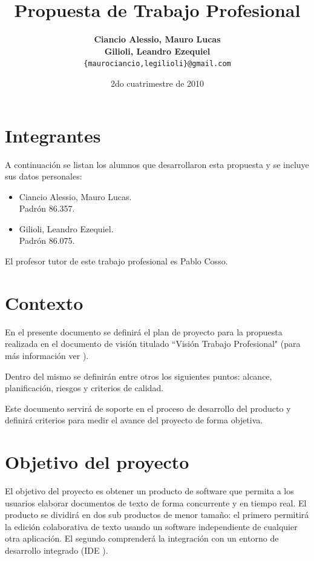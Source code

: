 \documentclass[12pt,a4paper]{article}
\title { \textbf{Propuesta de Trabajo Profesional}}
\date{2do cuatrimestre de 2010}
\author{\textbf{Ciancio Alessio, Mauro Lucas} \\
		\textbf{Gilioli, Leandro Ezequiel}	  \\
		\texttt{\{maurociancio,legilioli\}@gmail.com}
	}
\begin{document}
\maketitle
\tableofcontents
\newpage

	\section{Integrantes}

A continuación se listan los alumnos que desarrollaron esta propuesta y se incluye sus datos personales:

	\begin{itemize}
		\item Ciancio Alessio, Mauro Lucas. \\
		      Padrón 86.357.
		\item Gilioli, Leandro Ezequiel. \\
		      Padrón 86.075.
	\end{itemize}

El profesor tutor de este trabajo profesional es Pablo Cosso.

	\section{Contexto}

	En el presente documento se definirá el plan de proyecto para la propuesta realizada en el documento de visión titulado ``Visión Trabajo Profesional" (para más información ver \cite{visiontpprof}). 

	Dentro del mismo se definirán entre otros los siguientes puntos: alcance, planificación, riesgos y criterios de calidad. 

	Este documento servirá de soporte en el proceso de desarrollo del producto y definirá criterios para medir el avance del proyecto de forma objetiva.	
		
	\section{Objetivo del proyecto}

El objetivo del proyecto es obtener un producto de software que permita a los usuarios elaborar documentos de texto de forma concurrente y en tiempo real. El producto se dividirá en dos sub productos de menor tamaño: el primero permitirá la edición colaborativa de texto usando un software independiente de cualquier otra aplicación. El segundo comprenderá la integración con un entorno de desarrollo integrado (IDE \cite{ide}).
\end{document}
